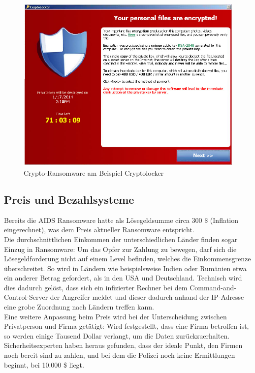 \begin{figure}[h!]
	\centering
	\includegraphics[width=\textwidth]{img/cryptolocker.png}
	\caption{Crypto-Ransomware am Beispiel \glqq Cryptolocker\grqq\cite{evolution}}
	\label{fig:cryptolocker}
\end{figure}


\subsection{Preis und Bezahlsysteme}

Bereits die AIDS Ransomware hatte als Lösegeldsumme circa 300 \$ (Inflation eingerechnet), was dem Preis aktueller Ransomware entspricht\cite{evolution}.\\ 
Die durchschnittlichen Einkommen der unterschiedlichen Länder finden sogar Einzug in Ransomware: Um das Opfer zur Zahlung zu bewegen, darf sich die Lösegeldforderung nicht auf einem Level befinden, welches die Einkommensgrenze überschreitet. So wird in Ländern wie beispielsweise Indien oder Rumänien etwa ein anderer Betrag gefordert, als in den USA und Deutschland. Technisch wird dies dadurch gelöst, dass sich ein infizierter Rechner bei dem Command-and-Control-Server der Angreifer meldet und dieser dadurch anhand der IP-Adresse eine grobe Zuordnung nach Ländern treffen kann.\\

Eine weitere Anpassung beim Preis wird bei der Unterscheidung zwischen Privatperson und Firma getätigt: Wird festgestellt, dass eine Firma betroffen ist, so werden einige Tausend Dollar verlangt, um die Daten zurückzuerhalten. Sicherheitsexperten haben heraus gefunden, dass der ideale Punkt, den Firmen noch bereit sind zu zahlen, und bei dem die Polizei noch keine Ermittlungen beginnt, bei 10.000 \$ liegt\cite{sweetspot}.\\


